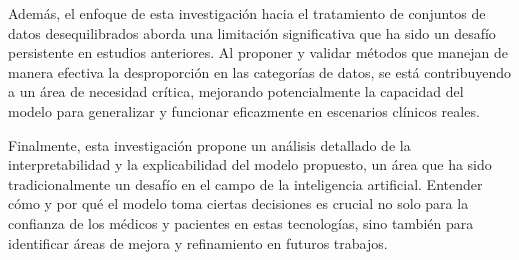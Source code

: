 Además, el enfoque de esta investigación hacia el tratamiento de conjuntos de datos desequilibrados aborda una limitación significativa que ha sido un desafío persistente en estudios anteriores. Al proponer y validar métodos que manejan de manera efectiva la desproporción en las categorías de datos, se está contribuyendo a un área de necesidad crítica, mejorando potencialmente la capacidad del modelo para generalizar y funcionar eficazmente en escenarios clínicos reales.

Finalmente, esta investigación propone un análisis detallado de la interpretabilidad y la explicabilidad del modelo propuesto, un área que ha sido tradicionalmente un desafío en el campo de la inteligencia artificial. Entender cómo y por qué el modelo toma ciertas decisiones es crucial no solo para la confianza de los médicos y pacientes en estas tecnologías, sino también para identificar áreas de mejora y refinamiento en futuros trabajos.